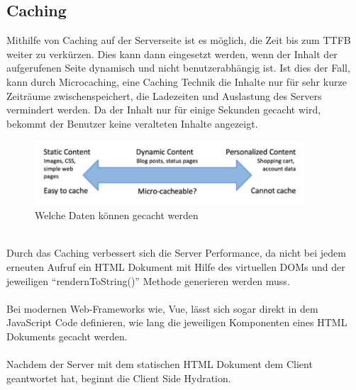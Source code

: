 \documentclass[runningheads]{llncs}
\begin{document}
\subsection{Caching}
\label{subsec:Caching}
Mithilfe von Caching auf der Serverseite ist es möglich, 
die Zeit bis zum TTFB weiter zu verkürzen. 
Dies kann dann eingesetzt werden, 
wenn der Inhalt der aufgerufenen Seite dynamisch und nicht benutzerabhängig ist. 
Ist dies der Fall, kann durch Microcaching, 
eine Caching Technik die Inhalte nur für sehr kurze Zeiträume zwischenspeichert, 
die Ladezeiten und Auslastung des Servers vermindert werden. 
Da der Inhalt nur für einige Sekunden gecacht wird, 
bekommt der Benutzer keine veralteten Inhalte angezeigt. 
\begin{figure}[h]
  \centering
  \includegraphics[width=10cm]{images/caching}
  \caption{Welche Daten können gecacht werden \cite{garett_2015}}
\end{figure}
\\
Durch das Caching verbessert sich die Server Performance, 
da nicht bei jedem erneuten Aufruf ein HTML Dokument mit Hilfe des virtuellen DOMs und 
der jeweiligen “rendernToString()” Methode generieren werden muss. 
\\
\\
Bei modernen Web-Frameworks wie, Vue, 
lässt sich sogar direkt in dem JavaScript Code definieren, 
wie lang die jeweiligen Komponenten eines HTML Dokuments gecacht werden. 
\\
\\
Nachdem der Server mit dem statischen HTML Dokument dem Client geantwortet hat, 
beginnt die Client Side Hydration.
\end{document}
